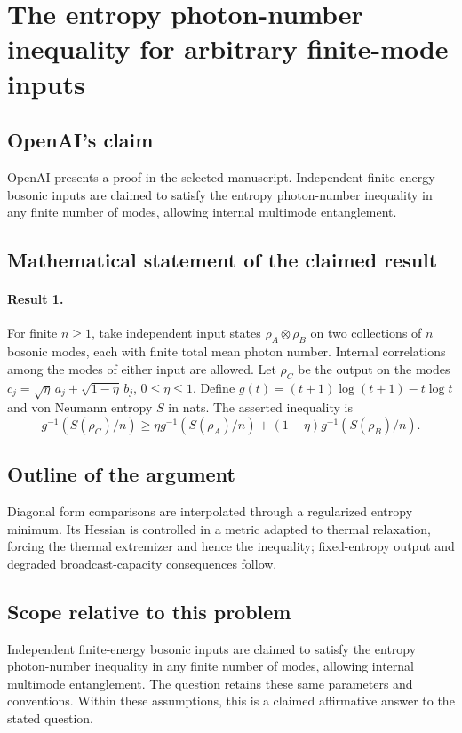 \documentclass[11pt]{article}
\begin{document}
\section*{The entropy photon-number inequality for arbitrary finite-mode inputs}

\subsection{OpenAI's claim}
OpenAI presents a proof in the selected manuscript. Independent finite-energy bosonic inputs are claimed to satisfy the entropy photon-number inequality in any finite number of modes, allowing internal multimode entanglement.

\subsection{Mathematical statement of the claimed result}
\paragraph{Result 1.} For finite \(n\ge1\), take independent input states \(\rho_A\otimes\rho_B\) on two collections of \(n\) bosonic modes, each with finite total mean photon number. Internal correlations among the modes of either input are allowed. Let \(\rho_C\) be the output on the modes \(c_j=\sqrt\eta\,a_j+\sqrt{1-\eta}\,b_j\), \(0\le\eta\le1\). Define \(g(t)=(t+1)\log(t+1)-t\log t\) and von Neumann entropy \(S\) in nats. The asserted inequality is
\[
 g^{-1}(S(\rho_C)/n)\ge
 \eta g^{-1}(S(\rho_A)/n)+(1-\eta)g^{-1}(S(\rho_B)/n).
\]

\subsection{Outline of the argument}
Diagonal form comparisons are interpolated through a regularized entropy minimum. Its Hessian is controlled in a metric adapted to thermal relaxation, forcing the thermal extremizer and hence the inequality; fixed-entropy output and degraded broadcast-capacity consequences follow.

\subsection{Scope relative to this problem}
Independent finite-energy bosonic inputs are claimed to satisfy the entropy photon-number inequality in any finite number of modes, allowing internal multimode entanglement. The question retains these same parameters and conventions. Within these assumptions, this is a claimed affirmative answer to the stated question.
\end{document}
